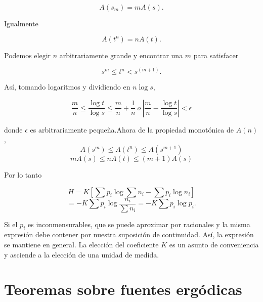 \begin{appendices}
\begin{equation}
A(s_{m})=mA(s).
\end{equation}

Igualmente

\begin{equation}
A(t^{n})=nA(t).
\end{equation}

Podemos elegir $n$ arbitrariamente grande y encontrar una $m$ para satisfacer

\begin{equation}
s^{m} \leq t^{n} < s^{(m+1)}.
\end{equation}

As\'i, tomando logaritmos y dividiendo en $n\log s$,

\begin{equation}
\frac{m}{n}\leq \frac{\log  t}{\log  s}\leq \frac{m}{n}+\frac{1}{n} \ o \ 
\left|\frac{m}{n}-\frac{\log  t}{\log  s}\right| < \epsilon 
\end{equation}

donde $\epsilon$ es arbitrariamente peque\~na.Ahora de la propiedad 
monot\'onica de $A(n)$,
\begin{equation}
A(s^{m})\leq A(t^{n})\leq A(s^{m+1})
\end{equation}
\begin{equation}
mA(s)\leq nA(t) \leq (m+1)A(s)
\end{equation}

Por lo tanto

\begin{equation}
H=K\left[\sum p_{i}\log \sum n_{i}-\sum p_{i}\log n_{i}\right]
\end{equation}
\begin{equation}
=-K\sum p_{i}\log \frac{n_{i}}{\sum n_{i}}=-K\sum p_{i}\log p_{i}.
\end{equation}

Si el $p_{i}$ es inconmensurables, que se puede aproximar por racionales y la misma 
expresi\'on debe contener por nuestra suposici\'on de continuidad. As\'i, la expresi\'on 
se mantiene en general. La elecci\'on del coeficiente $K$ es un asunto de conveniencia y 
asciende a la elecci\'on de una unidad de medida.

\clearpage

\chapter{Teoremas sobre fuentes erg\'odicas}


\end{appendices}
